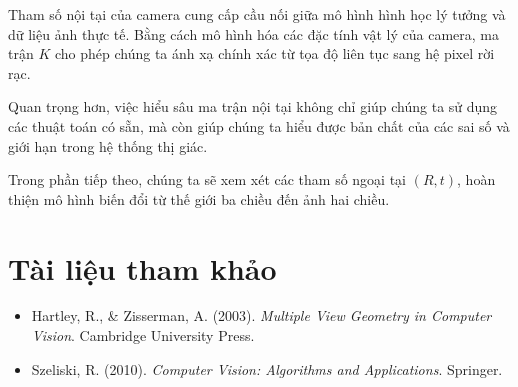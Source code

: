 Tham số nội tại của camera cung cấp cầu nối giữa mô hình hình học lý tưởng và dữ liệu ảnh thực tế. Bằng cách mô hình hóa các đặc tính vật lý của camera, ma trận $K$ cho phép chúng ta ánh xạ chính xác từ tọa độ liên tục sang hệ pixel rời rạc.

Quan trọng hơn, việc hiểu sâu ma trận nội tại không chỉ giúp chúng ta sử dụng các thuật toán có sẵn, mà còn giúp chúng ta hiểu được bản chất của các sai số và giới hạn trong hệ thống thị giác.

Trong phần tiếp theo, chúng ta sẽ xem xét các tham số ngoại tại $(R, t)$, hoàn thiện mô hình biến đổi từ thế giới ba chiều đến ảnh hai chiều.

\section*{Tài liệu tham khảo}
\begin{itemize}
	\item[1] Hartley, R., \& Zisserman, A. (2003). \textit{Multiple View Geometry in Computer Vision}. Cambridge University Press.
	\item[2] Szeliski, R. (2010). \textit{Computer Vision: Algorithms and Applications}. Springer.
\end{itemize}